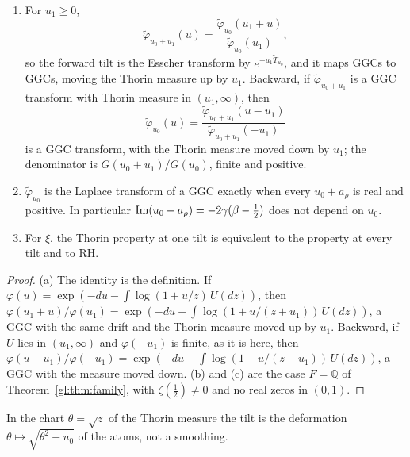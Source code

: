 \begin{theorem}\label{tf:thm:tilt}
\begin{enumerate}
\item[(a)] For $u_1\ge0$,
\[
\widetilde\varphi_{u_0+u_1}(u)=\frac{\widetilde\varphi_{u_0}(u_1+u)}{\widetilde\varphi_{u_0}(u_1)},
\]
so the forward tilt is the Esscher transform by $e^{-u_1\widetilde T_{u_0}}$, and it maps GGCs to GGCs, moving the Thorin measure up by $u_1$. Backward, if $\widetilde\varphi_{u_0+u_1}$ is a GGC transform with Thorin measure in $(u_1,\infty)$, then
\[
\widetilde\varphi_{u_0}(u)=\frac{\widetilde\varphi_{u_0+u_1}(u-u_1)}{\widetilde\varphi_{u_0+u_1}(-u_1)}
\]
is a GGC transform, with the Thorin measure moved down by $u_1$; the denominator is $G(u_0+u_1)/G(u_0)$, finite and positive.
\item[(b)] $\widetilde\varphi_{u_0}$ is the Laplace transform of a GGC exactly when every $u_0+a_\rho$ is real and positive. In particular $\operatorname{Im}(u_0+a_\rho)=-2\gamma(\beta-\tfrac12)$ does not depend on $u_0$.
\item[(c)] For $\xi$, the Thorin property at one tilt is equivalent to the property at every tilt and to RH.
\end{enumerate}
\end{theorem}

\begin{proof}
(a) The identity is the definition. If $\varphi(u)=\exp(-du-\int\log(1+u/z)\,U(dz))$, then $\varphi(u_1+u)/\varphi(u_1)=\exp(-du-\int\log(1+u/(z+u_1))\,U(dz))$, a GGC with the same drift and the Thorin measure moved up by $u_1$. Backward, if $U$ lies in $(u_1,\infty)$ and $\varphi(-u_1)$ is finite, as it is here, then $\varphi(u-u_1)/\varphi(-u_1)=\exp(-du-\int\log(1+u/(z-u_1))\,U(dz))$, a GGC with the measure moved down. (b) and (c) are the case $F=\mathbb Q$ of Theorem~\ref{gl:thm:family}, with $\zeta(\tfrac12)\ne0$ and no real zeros in $(0,1)$.
\end{proof}

In the chart $\theta=\sqrt z$ of the Thorin measure the tilt is the deformation $\theta\mapsto\sqrt{\theta^2+u_0}$ of the atoms, not a smoothing.
